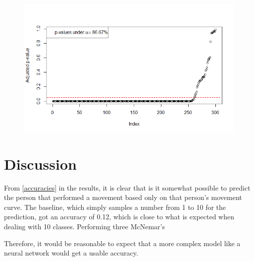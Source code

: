 \documentclass[11pt, fleqn, titlepage]{article}
\begin{document}
\begin{figure}
	\centering
	\includegraphics[width=0.7\linewidth]{billeder/pvals_res.png}
	\caption{}
	\label{fig:pvalsres}
\end{figure}





\section{Discussion}
From \ref{accuracies} in the results, it is clear that is it somewhat possible to predict the person that performed a movement based only on that person's movement curve. The baseline, which simply samples a number from 1 to 10 for the prediction, got an accuracy of 0.12, which is close to what is expected when dealing with 10 classes. Performing three McNemar's

Therefore, it would be reasonable to expect that a more complex model like a neural network would get a usable accuracy.
\end{document}
